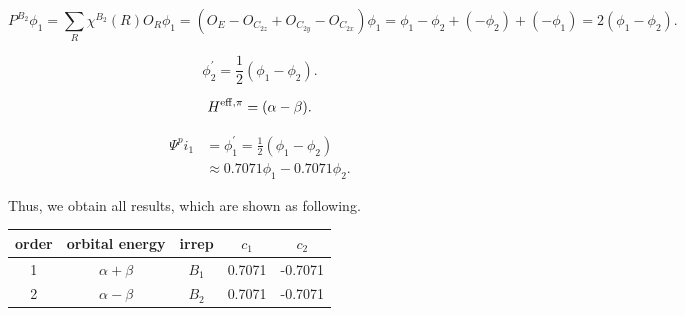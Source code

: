 \documentclass[a4paper]{book}
\newcommand{\Heff}{H^{\rm eff,\pi}}
\begin{document}
\begin{solution}
\begin{enumerate}[label=(\alph*)]
		
		\begin{equation*}
		P^{B_2}\phi_1 = \sum_{R} \chi^{B_2}(R) O_R \phi_1 = (O_E - O_{C_{2z}} + O_{C_{2y}} - O_{C_{2x}})\phi_1 = \phi_1 - \phi_2 + (-\phi_2) + (-\phi_1) = 2(\phi_1 - \phi_2) .
		\end{equation*}
		
		\begin{equation*}
		\phi^\prime_2 = \frac{1}{2}(\phi_1 - \phi_2) .
		\end{equation*}
		
		\begin{equation*}
			\Heff = ( \alpha - \beta ).
		\end{equation*}
		
		\begin{align}
			\Psi^pi_1 &= \phi^\prime_1 = \frac{1}{2}(\phi_1 - \phi_2) \\
			&\approx 0.7071 \phi_1 - 0.7071 \phi_2.
		\end{align}
		
		Thus, we obtain all results, which are shown as following.
		
		\begin{center}
		\begin{tabular}{ccccc}\hline
		order 	& orbital energy & irrep & $c_1$ & $c_2$ \\ \hline
			1	&	$\alpha+\beta$	&	$B_1$	&	0.7071	&	-0.7071	\\
			2	&	$\alpha-\beta$	&	$B_2$	&	0.7071	&	-0.7071	\\ \hline
		\end{tabular}
		\end{center}
		

\end{enumerate}
\end{solution}
\end{document}
